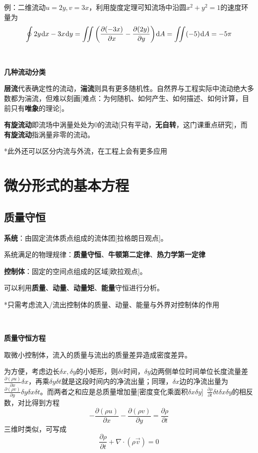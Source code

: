 \documentclass[a4paper,UTF8,fontset=windows]{ctexart}
\newcommand*{\dr}{\hspace{0.07em}\mathrm{d}}
\begin{document}
例：二维流动$u=2y,v=3x$，利用旋度定理可知流场中沿圆$x^2+y^2=1$的速度环量为
$$\oint 2y\dr x-3x\dr y=\iint\bigg(\frac{\partial(-3x)}{\partial x}-\frac{\partial(2y)}{\partial y}\bigg)\dr A=\iint(-5)\dr A=-5\pi$$

\

\textbf{几种流动分类}

\textbf{层流}代表确定性的流动，\textbf{湍流}则具有更多随机性。自然界与工程实际中流动绝大多数都为湍流，但难以刻画[难点：为何随机、如何产生、如何描述、如何计算，目前只有\textbf{唯象}的理论]。

\textbf{有旋流动}即流场中涡量处处为0的流动[只有平动，\textbf{无自转}，这门课重点研究]，而\textbf{有旋流动}指涡量非零的流动。

*此外还可以区分内流与外流，在工程上会有更多应用

\section{微分形式的基本方程}
\subsection{质量守恒}
\textbf{系统}：由固定流体质点组成的流体团[拉格朗日观点]。

系统满足的物理规律：\textbf{质量守恒}、\textbf{牛顿第二定律}、\textbf{热力学第一定律}

\textbf{控制体}：固定的空间点组成的区域[欧拉观点]。

可以利用\textbf{质量}、\textbf{动量}、\textbf{动量矩}、\textbf{能量}守恒进行分析。

*只需考虑流入/流出控制体的质量、动量、能量与外界对控制体的作用

\

\textbf{质量守恒方程}

取微小控制体，流入的质量与流出的质量差异造成密度差异。

为方便，考虑边长$\delta x,\delta y$的小矩形，则$\delta t$时间，$\delta y$边两侧单位时间单位长度流量差$\frac{\partial(\rho u)}{\partial x}\delta x$，再乘$\delta y\delta t$就是这段时间内的净流出量；同理，$\delta x$边的净流出量为$\frac{\partial(\rho v)}{\partial y}\delta y\delta x\delta t$。而两者之和应是总质量增加量[密度变化乘面积$\delta x\delta y$]\ $\frac{\partial\rho}{\partial t}\delta t\delta x\delta y$的相反数，对比得到方程
$$-\frac{\partial(\rho u)}{\partial x}-\frac{\partial(\rho v)}{\partial y}=\frac{\partial\rho}{\partial t}$$
三维时类似，可写成
$$\frac{\partial\rho}{\partial t}+\nabla\cdot(\rho\vec{v})=0$$
\end{document}
